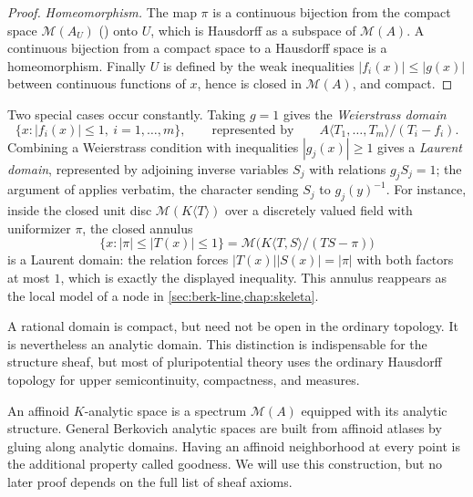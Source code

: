 \begin{proof}
\emph{Homeomorphism.}
The map $\pi$ is a continuous bijection from the compact space
$\mathcal M(A_U)$ () onto $U$, which
is Hausdorff as a subspace of $\mathcal M(A)$.  A continuous bijection
from a compact space to a Hausdorff space is a homeomorphism.  Finally
$U$ is defined by the weak inequalities $|f_i(x)|\leq|g(x)|$ between
continuous functions of $x$, hence is closed in $\mathcal M(A)$, and
compact.
\end{proof}

\begin{example}
\label{ex:berk-weierstrass-laurent}
Two special cases occur constantly.  Taking $g=1$ gives the
\emph{Weierstrass domain}
\[
 \{x:|f_i(x)|\leq1,\ i=1,\ldots,m\},
 \qquad\text{represented by}\qquad
 A\langle T_1,\ldots,T_m\rangle/(T_i-f_i).
\]
Combining a Weierstrass condition with inequalities
$|g_j(x)|\geq1$ gives a \emph{Laurent domain},
represented by adjoining inverse variables $S_j$ with relations
$g_jS_j=1$; the argument of  applies
verbatim, the character sending $S_j$ to $g_j(y)^{-1}$.  For instance,
inside the closed unit disc $\mathcal M(K\langle T\rangle)$ over a
discretely valued field with uniformizer $\pi$, the closed annulus
\[
 \{x:|\pi|\leq|T(x)|\leq1\}
 =\mathcal M\bigl(K\langle T,S\rangle/(TS-\pi)\bigr)
\]
is a Laurent domain: the relation forces $|T(x)||S(x)|=|\pi|$ with both
factors at most $1$, which is exactly the displayed inequality.  This
annulus reappears as the local model of a node in
\cref{sec:berk-line,chap:skeleta}.
\end{example}

\begin{remark}
\label{rem:berk-topology-analytic-domains}
A rational domain is compact, but need not be open in the ordinary topology.
It is nevertheless an analytic domain. This distinction is indispensable
for the structure sheaf, but most of pluripotential theory uses the ordinary
Hausdorff topology for upper semicontinuity, compactness, and measures.
\end{remark}

An affinoid $K$-analytic space is a spectrum $\mathcal M(A)$ equipped with
its analytic structure. General Berkovich analytic spaces are built from
affinoid atlases by gluing along analytic domains. Having an affinoid
neighborhood at every point is the additional property called goodness. We
will use this construction, but no later proof depends on the full list of
sheaf axioms.

